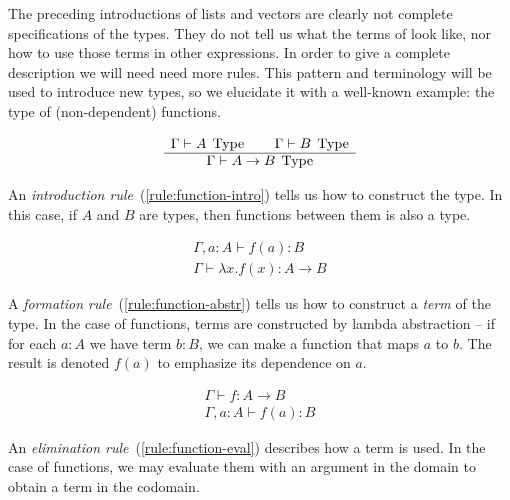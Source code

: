 The preceding introductions of lists and vectors are clearly not complete specifications
of the types. They do not tell us what the terms of look like, nor how to use those
terms in other expressions. In order to give a complete description we will need
need more rules. This pattern and terminology will be used to introduce new
types, so we elucidate it with a well-known example: the type of (non-dependent)
functions.

\begin{equation}
  \begin{array}{c}
    \Gamma \vdash A \; \operatorname{Type} \qquad \Gamma \vdash B \; \operatorname{Type}\\
    \hline
    \Gamma \vdash A \rightarrow B \; \operatorname{Type}
  \end{array}
  \label{rule:function-intro}
\end{equation}

An \emph{introduction rule}~(\ref{rule:function-intro}) tells us how to construct
the type. In this case, if $A$ and $B$ are types, then functions between them is
also a type.

\begin{equation}
  \begin{array}{c}
    \Gamma, a : A \vdash f(a) : B\\
    \hline
    \Gamma \vdash \lambda x . f(x) : A \rightarrow B
  \end{array}
  \label{rule:function-abstr}
\end{equation}

A \emph{formation rule}~(\ref{rule:function-abstr}) tells us how to construct a
\emph{term} of the type. In the case of functions, terms are constructed by
lambda abstraction -- if for each $a:A$ we have term $b:B$, we can make a
function that maps $a$ to $b$. The result is denoted $f(a)$ to emphasize its
dependence on $a$.

\begin{equation}
  \begin{array}{c}
    \Gamma \vdash f : A \rightarrow B\\
    \hline
    \Gamma, a : A \vdash f(a) : B
  \end{array}
  \label{rule:function-eval}
\end{equation}

An \emph{elimination rule}~(\ref{rule:function-eval}) describes how a term is
used. In the case of functions, we may evaluate them with an argument in the
domain to obtain a term in the codomain.

